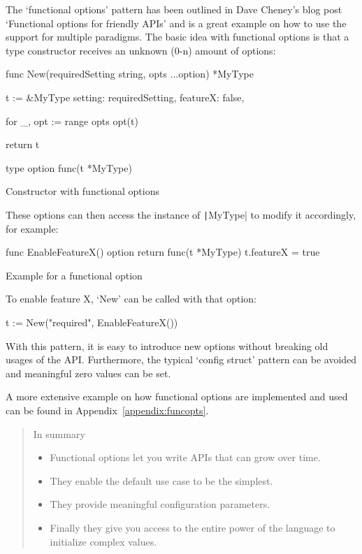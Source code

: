 The `functional options' pattern has been outlined in Dave Cheney's blog post `Functional options
for friendly APIs'\autocite{functional-options} and is a great example on how to use the support for multiple paradigms.
The basic idea with functional options is that a type constructor receives an unknown (0-n) amount
of options:
\begin{code}
\begin{gocode}
func New(requiredSetting string, opts ...option) *MyType {
	t := &MyType{
		setting: requiredSetting,
		featureX: false,
	}

	for _, opt := range opts {
		opt(t)
	}

	return t
}

type option func(t *MyType)
\end{gocode}
\caption{Constructor with functional options}
\end{code}

These options can then access the instance of \texttt|MyType| to modify it accordingly,
for example:

\begin{code}
\begin{gocode}
func EnableFeatureX() option {
	return func(t *MyType) {
		t.featureX = true
	}
}
\end{gocode}
\caption{Example for a functional option}
\end{code}

To enable feature X, `New' can be called with that option:
\begin{gocode}
t := New("required", EnableFeatureX())
\end{gocode}

With this pattern, it is easy to introduce new options without breaking old usages of the API.
Furthermore, the typical `config struct' pattern can be avoided and meaningful zero values
can be set.

A more extensive example on how functional options are implemented and used can be found in
Appendix~\ref{appendix:funcopts}.

\begin{quote}
    In summary
    \begin{itemize}
        \item Functional options let you write APIs that can grow over time.
        \item They enable the default use case to be the simplest.
        \item They provide meaningful configuration parameters.
        \item Finally they give you access to the entire power of the language to initialize complex values.
    \end{itemize}\autocite{functional-options}
\end{quote}

